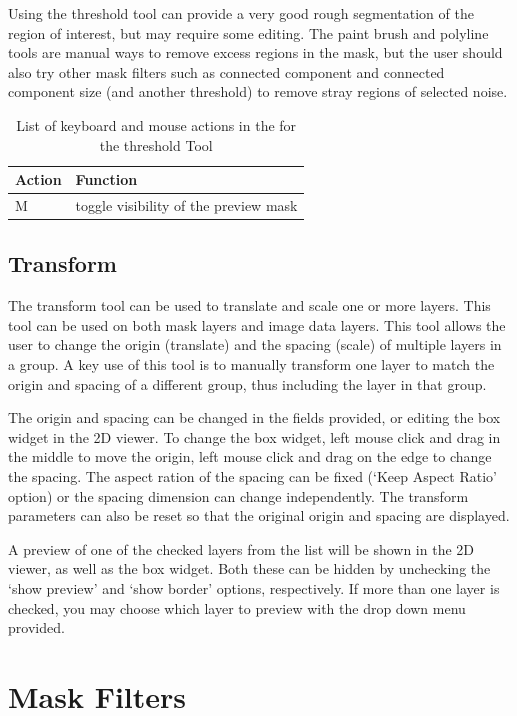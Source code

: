 \documentclass[fleqn,11pt,openany]{book}
\begin{document}
Using the threshold tool can provide a very good rough segmentation of the region of interest, but may require some editing.  The paint brush and polyline tools are manual ways to remove excess regions in the mask, but the user should also try other mask filters such as connected component and connected component size (and another threshold) to remove stray regions of selected noise.  

\begin{table}[h!]
\label{tab:thresholdkey}
\caption{List of keyboard and mouse actions in the for the threshold Tool}
\begin{tabular}{|l|l|}
\hline
{\bf Action} & {\bf Function}\\
\hline 
M & toggle visibility of the preview mask\\
\hline
\end{tabular}
\end{table}

\subsection{Transform}

The transform tool can be used to translate and scale one or more layers.  This tool can be used on both mask layers and image data layers.  This tool allows the user to change the origin (translate) and the spacing (scale) of multiple layers in a group.  A key use of this tool is to manually transform one layer to match the origin and spacing of a different group, thus including the layer in that group. 

The origin and spacing can be changed in the fields provided, or editing the box widget in the 2D viewer.  To change the box widget, left mouse click and drag in the middle to move the origin, left mouse click and drag on the edge to change the spacing.  The aspect ration of the spacing can be fixed (`Keep Aspect Ratio' option) or the spacing dimension can change independently.  The transform parameters can also be reset so that the original origin and spacing are displayed.  

A preview of one of the checked layers from the list will be shown in the 2D viewer, as well as the box widget.  Both these can be hidden by unchecking the `show preview' and `show border' options, respectively.  If more than one layer is checked, you may choose which layer to preview with the drop down menu provided.  

\section{Mask Filters}
\end{document}

